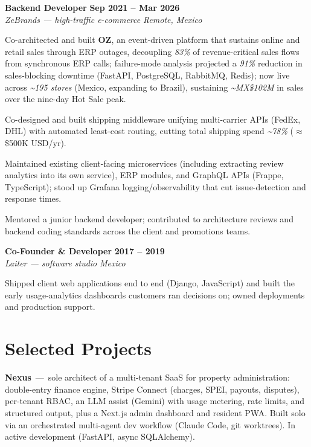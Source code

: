 \documentclass[10pt,a4paper]{article}
\newcommand{\role}[4]{%
  \textbf{#1} \hfill \textbf{#3}\\[1pt]
  {\color{soft}\textit{#2} \hfill \textit{#4}}\par\vspace{2pt}}
\newcommand{\project}[2]{\textbf{#1} \,---\, #2\par\vspace{1pt}}
\begin{document}
\role{Backend Developer}{ZeBrands — high-traffic e-commerce}{Sep 2021 -- Mar 2026}{Remote, Mexico}
\begin{tight}
  \item Co-architected and built \textbf{OZ}, an event-driven platform that sustains online and retail sales through ERP outages, decoupling \textit{83\%} of revenue-critical sales flows from synchronous ERP calls; failure-mode analysis projected a \textit{91\%} reduction in sales-blocking downtime (FastAPI, PostgreSQL, RabbitMQ, Redis); now live across \textit{\textasciitilde195 stores} (Mexico, expanding to Brazil), sustaining \textit{\textasciitilde MX\$102M} in sales over the nine-day Hot Sale peak.
  \item Co-designed and built shipping middleware unifying multi-carrier APIs (FedEx, DHL) with automated least-cost routing, cutting total shipping spend \textit{\textasciitilde78\%} ($\approx$ \$500K USD/yr).
  \item Maintained existing client-facing microservices (including extracting review analytics into its own service), ERP modules, and GraphQL APIs (Frappe, TypeScript); stood up Grafana logging/observability that cut issue-detection and response times.
  \item Mentored a junior backend developer; contributed to architecture reviews and backend coding standards across the client and promotions teams.
\end{tight}
\vspace{4pt}

\role{Co-Founder \& Developer}{Laiter — software studio}{2017 -- 2019}{Mexico}
\begin{tight}
  \item Shipped client web applications end to end (Django, JavaScript) and built the early usage-analytics dashboards customers ran decisions on; owned deployments and production support.
\end{tight}

\section*{Selected Projects}
\begin{tight}
  \item \project{Nexus}{sole architect of a multi-tenant SaaS for property administration: double-entry finance engine, Stripe Connect (charges, SPEI, payouts, disputes), per-tenant RBAC, an LLM assist (Gemini) with usage metering, rate limits, and structured output, plus a Next.js admin dashboard and resident PWA. Built solo via an orchestrated multi-agent dev workflow (Claude Code, git worktrees). In active development (FastAPI, async SQLAlchemy).}
\end{tight}
\end{document}
